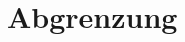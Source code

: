 \documentclass[Bachelorarbeit.tex]{subfiles}
\begin{document}
\begin{comment}
\subsection{Usecase II - On Trip Information (\ac{UC}2)}
Hierbei handelt es sich um weiteres Feature für die Optimierung von Planung- bzw. Arbeitsvorbereitungs- Prozessen von Außendienst Mitarbeitern. Diese sollen bei der Planung ihrer Route, durch das einblenden zusätzlicher Information, unterstützt werden. \\
\\
\textbf{Beispiel: Außendienst Mitarbeiter\_in}
\begin{enumerate}
	\item Mitarbeiter\_in wählt Ziel der Route aus 
	\begin{enumerate}
		\item Ziel kann Ticket, Kunde oder Adresse sein
	\end{enumerate}
	\item System zeigt weitere Informationen entlang der Route oder am Ziel an\footnote{Die Auswahl der Informationen soll gefiltert werden können. Eventuell mehrere Filter Ebenen wie Kundenbetreuung oder offene Tickets. Auf Basis der getroffenen Filterebene können anschließend weitere Filter gewählt werden wie beispielsweise: geplanter Zeitaufwand von offenen Ticket, aktueller Betreuung Status, etc. }
	\begin{enumerate}
		\item Mögliche Informationen:
		\begin{enumerate}
			\item Offene Tickets
			\item Betreuungsstatus von Kunden\footnote{Betreuungstatus: ist ein Schlüssel der sich aus: Betreuungsaufwand, Priorität des Kunden und Dauer seit dem letzten Betreuungstermin zusammensetzt.}
			\item Evtl. weitere Informationen
		\end{enumerate}
	\end{enumerate}
	\item Mitarbeiter\_in wählt zusätzliche Aufgaben aus
	\begin{enumerate}
		\item System weißt das Ticket der/dem Mitarbeiter\_in zu
		\item Evtl. automatisch weitere Tickets anlegen und der/dem Mitarbeiter\_in zuweist.\footnote{Beispiel: Betreuungstermin – System legt automatisch ein Ticket zur Termins-findung/-vereinbarung mit dem Kunden an und weißt es der/dem Mitarbeiter\_in zu.}
	\end{enumerate}
\end{enumerate}

\end{comment}

\section{Abgrenzung}
\end{document}
